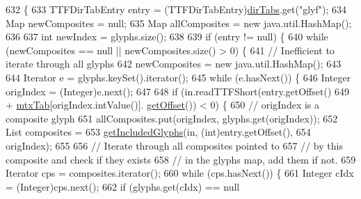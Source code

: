 \begin{DoxyCode}
632                                                            \{
633         TTFDirTabEntry entry = (TTFDirTabEntry)\mbox{\hyperlink{classorg_1_1newdawn_1_1slick_1_1tools_1_1hiero_1_1truetype_1_1_t_t_f_file_ace74820d11ce19f9c04797c2715ac728}{dirTabs}}.get(\textcolor{stringliteral}{"glyf"});
634         Map newComposites = null;
635         Map allComposites = \textcolor{keyword}{new} java.util.HashMap();
636 
637         \textcolor{keywordtype}{int} newIndex = glyphs.size();
638 
639         \textcolor{keywordflow}{if} (entry != null) \{
640             \textcolor{keywordflow}{while} (newComposites == null || newComposites.size() > 0) \{
641                 \textcolor{comment}{// Inefficient to iterate through all glyphs}
642                 newComposites = \textcolor{keyword}{new} java.util.HashMap();
643 
644                 Iterator e = glyphs.keySet().iterator();
645                 \textcolor{keywordflow}{while} (e.hasNext()) \{
646                     Integer origIndex = (Integer)e.next();
647 
648                     \textcolor{keywordflow}{if} (in.readTTFShort(entry.getOffset()
649                                         + \mbox{\hyperlink{classorg_1_1newdawn_1_1slick_1_1tools_1_1hiero_1_1truetype_1_1_t_t_f_file_ad78a13682e242fc4a0b5d34a8e5807fa}{mtxTab}}[origIndex.intValue()].
      \mbox{\hyperlink{classorg_1_1newdawn_1_1slick_1_1tools_1_1hiero_1_1truetype_1_1_t_t_f_mtx_entry_af6ea5be112bd06d92519fd86878e000d}{getOffset}}()) < 0) \{
650                         \textcolor{comment}{// origIndex is a composite glyph}
651                         allComposites.put(origIndex, glyphs.get(origIndex));
652                         List composites =
653                             \mbox{\hyperlink{classorg_1_1newdawn_1_1slick_1_1tools_1_1hiero_1_1truetype_1_1_t_t_f_sub_set_file_ab464741e727d29adcb652374d2aa4849}{getIncludedGlyphs}}(in, (\textcolor{keywordtype}{int})entry.getOffset(),
654                                               origIndex);
655 
656                         \textcolor{comment}{// Iterate through all composites pointed to}
657                         \textcolor{comment}{// by this composite and check if they exists}
658                         \textcolor{comment}{// in the glyphs map, add them if not.}
659                         Iterator cps = composites.iterator();
660                         \textcolor{keywordflow}{while} (cps.hasNext()) \{
661                             Integer cIdx = (Integer)cps.next();
662                             \textcolor{keywordflow}{if} (glyphs.get(cIdx) == null

\end{DoxyCode}
